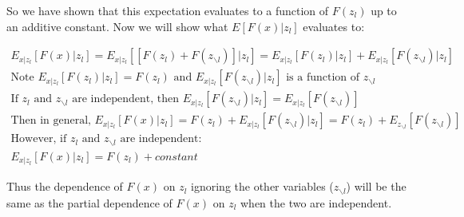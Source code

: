 \documentclass[11pt]{article}
\begin{document}
\vspace{5 mm}
\noindent
So we have shown that this expectation evaluates to a function of $F(z_{l})$ 
up to an additive constant. Now we will show what $E[F(x)|z_{l}]$ evaluates to:


\begin{gather*}
E_{x|z_{l}}[F(x)|z_{l}] = E_{x|z_{l}}[[F(z_{l}) + F(z_{\backslash l})]|z_{l}] = 
E_{x|z_{l}}[F(z_{l})|z_{l}] + E_{x|z_{l}}[F(z_{\backslash l})|z_{l}]\\
\text{Note } E_{x|z_{l}}[F(z_{l})|z_{l}] = F(z_{l}) \text{ and } 
E_{x|z_{l}}[F(z_{\backslash l})|z_{l}] \text{ is a function of } z_{\backslash l}\\
\text{If } z_{l} \text{ and } z_{\backslash l} \text{ are independent, then }
E_{x|z_{l}}[F(z_{\backslash l})|z_{l}] = E_{x|z_{l}}[F(z_{\backslash l})]\\
\text{Then in general, } E_{x|z_{l}}[F(x)|z_{l}] = 
F(z_{l}) + E_{x|z_{l}}[F(z_{\backslash l})|z_{l}] = F(z_{l}) + E_{z_{\backslash l}}[F(z_{\backslash l})]\\
\text{However, if } z_{l} \text{ and } z_{\backslash l} \text{ are independent:}\\
E_{x|z_{l}}[F(x)|z_{l}] = F(z_{l}) + constant
\end{gather*}

\vspace{5 mm}
\noindent
Thus the dependence of $F(x)$ on $z_{l}$ ignoring the other variables 
($z_{\backslash l}$) will be the same as the partial dependence of $F(x)$ on 
$z_{l}$ when the two are independent.
\end{document}
